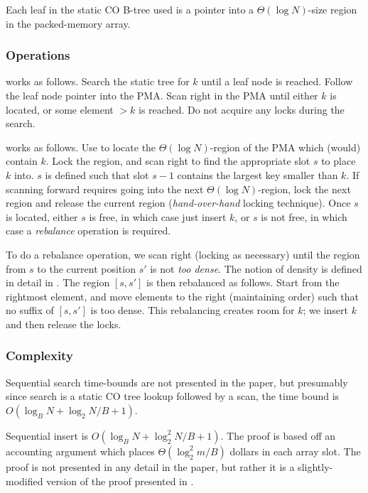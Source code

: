 \documentclass{style}
\begin{document}
Each leaf in the static CO B-tree used is a pointer into a $\Theta(\log
N)$-size region in the packed-memory array. 

\subsubsection{Operations}

\Search{} works as follows. Search the static tree for $k$ until
a leaf node is reached. Follow the leaf node pointer into the PMA.
Scan right in the PMA until either $k$ is located, or some element
$> k$ is reached. Do not acquire any locks during the search.

\Insert{} works as follows. Use \Search{} to locate the $\Theta(\log N)$-region
of the PMA which (would) contain $k$. Lock the region, and scan right to find
the appropriate slot $s$ to place $k$ into. $s$ is defined such that slot $s -
1$ contains the largest key smaller than $k$. If scanning forward requires
going into the next $\Theta(\log N)$-region, lock the next region and release
the current region (\textit{hand-over-hand} locking technique). Once $s$
is located, either $s$ is free, in which case just insert $k$, or $s$ is not free,
in which case a \textit{rebalance} operation is required.

To do a rebalance operation, we scan right (locking as necessary) until the
region from $s$ to the current position $s'$ is not \textit{too dense}. The
notion of density is defined in detail in \cite{BenderFiGi05}. The region
$[s, s']$ is then rebalanced as follows. Start from the rightmost element,
and move elements to the right (maintaining order) such that no suffix of
$[s, s']$ is too dense. This rebalancing creates room for $k$; we insert $k$
and then release the locks.

\subsubsection{Complexity}

Sequential search time-bounds are not presented in the paper,
but presumably since search is a static CO tree lookup followed
by a scan, the time bound is $O(\log_{B}{N} + {\log_2{N}}/{B} + 1)$.

Sequential insert is $O(\log_{B}{N} + \log_2^2{N}/{B} + 1)$. The proof
is based off an accounting argument which places $\Theta(\log_2^2{m}/B)$
dollars in each array slot. The proof is not presented in any detail in the
paper, but rather it is a slightly-modified version of the proof presented
in \cite{Katriel02}. 
\end{document}
